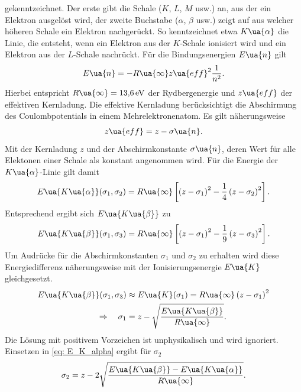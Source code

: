 gekenntzeichnet. Der erste gibt die Schale ($K$, $L$, $M$ usw.) an, aus der ein Elektron ausgelöst wird, der zweite Buchstabe
($\alpha$, $\beta$ usw.) zeigt auf aus welcher höheren Schale ein Elektron nachgerückt. So kenntzeichnet etwa
$K\ua{\alpha}$ die Linie, die entsteht, wenn ein Elektron aus der $K$-Schale ionisiert wird und ein Elektron aus der $L$-Schale
nachrückt. Für die Bindungsenergien $E\ua{n}$ gilt
\begin{equation}
  E\ua{n} = -R\ua{\infty} z\ua{eff}^2 \frac{1}{n^2}.
  \label{eq: E_niveaus}
\end{equation}
Hierbei entspricht $R\ua{\infty} = \SI{13.6}{\eV}$ der Rydbergenergie und $z\ua{eff}$ der effektiven Kernladung. Die effektive
Kernladung berücksichtigt die Abschirmung des Coulombpotentials in einem Mehrelektronenatom. Es gilt näherungsweise
\begin{equation}
  z\ua{eff} = z - \sigma\ua{n}.
  \label{eq: abschirmkonstante}
\end{equation}
Mit der Kernladung $z$ und der Abschirmkonstante $\sigma\ua{n}$, deren Wert für alle Elektonen einer Schale als konstant angenommen wird.
Für die Energie der $K\ua{\alpha}$-Linie gilt damit
\begin{equation}
  E\ua{K\ua{\alpha}}(\sigma_1, \sigma_2) = R\ua{\infty} \left[\left(z - \sigma_1\right)^2 -  \frac{1}{4}\left(z - \sigma_2\right)^2\right].
  \label{eq: E_K_alpha}
\end{equation}
Entsprechend ergibt sich $E\ua{K\ua{\beta}}$ zu
\begin{equation}
  E\ua{K\ua{\beta}}(\sigma_1, \sigma_3) = R\ua{\infty} \left[\left(z - \sigma_1\right)^2 -  \frac{1}{9}\left(z - \sigma_3\right)^2\right].
  \label{eq: E_K_beta}
\end{equation}
Um Audrücke für die Abschirmkonstanten $\sigma_1$ und $\sigma_2$ zu erhalten wird diese Energiedifferenz
näherungsweise mit der Ionisierungsenergie $E\ua{K}$ gleichgesetzt.
\begin{align}
  \begin{aligned}
  E\ua{K\ua{\beta}}(\sigma_1, \sigma_3) &\approx E\ua{K}(\sigma_1) = R\ua{\infty} \left(z - \sigma_1\right)^2 \\
  \Rightarrow \quad \sigma_1 &= z - \sqrt{\frac{E\ua{K\ua{\beta}}}{R\ua{\infty}}}.
  \label{eq: sigma_1}
\end{aligned}
\end{align}
Die Lösung mit positivem Vorzeichen ist unphysikalisch und wird ignoriert. Einsetzen in \eqref{eq: E_K_alpha} ergibt für $\sigma_2$
\begin{equation}
  \sigma_2 = z - 2\sqrt{\frac{ E\ua{K\ua{\beta}} - E\ua{K\ua{\alpha}} }{ R\ua{\infty} } }.
  \label{eq: sigma_2}
\end{equation}

